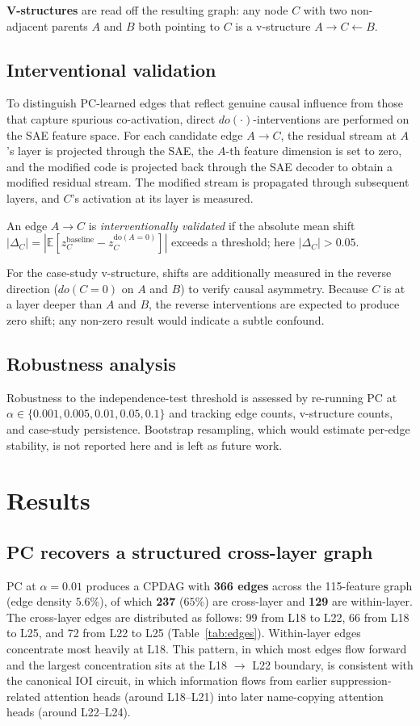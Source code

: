 \documentclass[conference]{IEEEtran}
\begin{document}
\textbf{V-structures} are read off the resulting graph: any node $C$ with two non-adjacent parents $A$ and $B$ both pointing to $C$ is a v-structure $A \to C \leftarrow B$.

\subsection{Interventional validation}\label{sec:interv}
To distinguish PC-learned edges that reflect genuine causal influence from those that capture spurious co-activation, direct $do(\cdot)$-interventions are performed on the SAE feature space. For each candidate edge $A \to C$, the residual stream at $A$'s layer is projected through the SAE, the $A$-th feature dimension is set to zero, and the modified code is projected back through the SAE decoder to obtain a modified residual stream. The modified stream is propagated through subsequent layers, and $C$'s activation at its layer is measured.

An edge $A \to C$ is \emph{interventionally validated} if the absolute mean shift $|\Delta_C| = |\mathbb{E}[z_C^{\text{baseline}} - z_C^{\text{do}(A=0)}]|$ exceeds a threshold; here $|\Delta_C| > 0.05$.

For the case-study v-structure, shifts are additionally measured in the reverse direction ($do(C=0)$ on $A$ and $B$) to verify causal asymmetry. Because $C$ is at a layer deeper than $A$ and $B$, the reverse interventions are expected to produce zero shift; any non-zero result would indicate a subtle confound.

\subsection{Robustness analysis}
Robustness to the independence-test threshold is assessed by re-running PC at $\alpha \in \{0.001, 0.005, 0.01, 0.05, 0.1\}$ and tracking edge counts, v-structure counts, and case-study persistence. Bootstrap resampling, which would estimate per-edge stability, is not reported here and is left as future work.

\section{Results}\label{sec:results}

\subsection{PC recovers a structured cross-layer graph}
PC at $\alpha = 0.01$ produces a CPDAG with \textbf{366 edges} across the 115-feature graph (edge density $5.6\%$), of which \textbf{237} ($65\%$) are cross-layer and \textbf{129} are within-layer. The cross-layer edges are distributed as follows: 99 from L18 to L22, 66 from L18 to L25, and 72 from L22 to L25 (Table~\ref{tab:edges}). Within-layer edges concentrate most heavily at L18. This pattern, in which most edges flow forward and the largest concentration sits at the L18 $\to$ L22 boundary, is consistent with the canonical IOI circuit, in which information flows from earlier suppression-related attention heads (around L18--L21) into later name-copying attention heads (around L22--L24).
\end{document}
